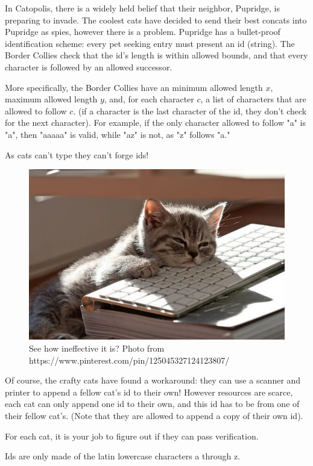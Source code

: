 
In Catopolis, there is a widely held belief that their neighbor, Pupridge, is preparing to invade. The coolest cats have decided to send their best concats into Pupridge as spies, however there is a problem. Pupridge has a bullet-proof identification scheme: every pet seeking entry must present an id (string). The Border Collies check that the id's length is within allowed bounds, and that every character is followed by an allowed successor. 

More specifically, the Border Collies have an minimum allowed length $x$, maximum allowed length $y$, and, for each character $c$, a list of characters that are allowed to follow $c$. (if a character is the last character of the id, they don't check for the next character). For example, if the only character allowed to follow "a" is "a", then "aaaaa" is valid, while "az" is not, as "z" follows "a."

As cats can't type they can't forge ids!

\begin{figure}[h]
	\begin{center}
	\includegraphics[height=0.3\textwidth]{catkeyboard}
	\caption{See how ineffective it is? Photo from https://www.pinterest.com/pin/125045327124123807/}
	\end{center}
\end{figure}

\medskip

Of course, the crafty cats have found a workaround: they can use a scanner and printer to append a fellow cat's id to their own! However resources are scarce, each cat can only append one id to their own, and this id has to be from one of their fellow cat's. (Note that they are allowed to append a copy of their own id).

\medskip

For each cat, it is your job to figure out if they can pass verification.

Ids are only made of the latin lowercase characters a through z.


